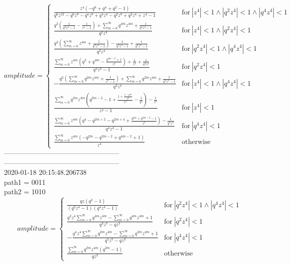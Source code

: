 $$amplitude = \begin{cases} \frac{z^{4} \left(- q^{6} + q^{4} + q^{2} - 1\right)}{q^{6} z^{12} - q^{6} z^{8} - q^{4} z^{8} + q^{4} z^{4} - q^{2} z^{8} + q^{2} z^{4} + z^{4} - 1} & \text{for}\: \left|{z^{4}}\right| < 1 \wedge \left|{q^{2} z^{4}}\right| < 1 \wedge \left|{q^{4} z^{4}}\right| < 1 \\\frac{q^{2} \left(\frac{1}{q^{2} z^{4} - 1} - \frac{1}{z^{4} - 1}\right) + \sum_{m=0}^{\infty} q^{4 m} z^{4 m} + \frac{1}{q^{2} z^{4} - 1}}{q^{2} z^{4}} & \text{for}\: \left|{z^{4}}\right| < 1 \wedge \left|{q^{2} z^{4}}\right| < 1 \\\frac{q^{2} \left(\sum_{m=0}^{\infty} z^{4 m} + \frac{1}{q^{2} z^{4} - 1}\right) - \frac{1}{q^{4} z^{4} - 1} + \frac{1}{q^{2} z^{4} - 1}}{q^{2} z^{4}} & \text{for}\: \left|{q^{2} z^{4}}\right| < 1 \wedge \left|{q^{4} z^{4}}\right| < 1 \\\frac{\sum_{m=0}^{\infty} z^{4 m} \left(q^{2} + q^{4 m} - \frac{q^{4 m - 2} + 1}{z^{4}}\right) + \frac{1}{z^{4}} + \frac{1}{q^{2} z^{4}}}{q^{2} z^{4} - 1} & \text{for}\: \left|{q^{2} z^{4}}\right| < 1 \\- \frac{q^{2} \left(\sum_{m=0}^{\infty} q^{2 m} z^{4 m} + \frac{1}{z^{4} - 1}\right) + \sum_{m=0}^{\infty} q^{2 m} z^{4 m} + \frac{1}{q^{4} z^{4} - 1}}{q^{2} z^{4}} & \text{for}\: \left|{z^{4}}\right| < 1 \wedge \left|{q^{4} z^{4}}\right| < 1 \\\frac{\sum_{m=0}^{\infty} q^{2 m} z^{4 m} \left(q^{2 m - 2} - 1 + \frac{1 + \frac{1 - q^{2 m}}{q^{2}}}{z^{4}} - \frac{1}{q^{2}}\right) - \frac{1}{z^{4}}}{z^{4} - 1} & \text{for}\: \left|{z^{4}}\right| < 1 \\\frac{\sum_{m=0}^{\infty} z^{4 m} \left(q^{4} - q^{2 m + 2} - q^{2 m + 4} + \frac{q^{2 m} + q^{2 m - 2} - 1}{z^{4}}\right) - \frac{1}{q^{2} z^{4}}}{q^{4} z^{4} - 1} & \text{for}\: \left|{q^{4} z^{4}}\right| < 1 \\\frac{\sum_{m=0}^{\infty} z^{4 m} \left(- q^{2 m} - q^{2 m - 2} + q^{4 m - 2} + 1\right)}{z^{4}} & \text{otherwise} \end{cases}$$
--------------------------------------------------\\
--------------------------------------------------\\
2020-01-18 20:15:48.206738\\
path1 = 0011\\
path2 = 1010\\
$$amplitude = \begin{cases} \frac{q z \left(q^{2} - 1\right)}{\left(q^{2} z^{4} - 1\right) \left(q^{4} z^{4} - 1\right)} & \text{for}\: \left|{q^{2} z^{4}}\right| < 1 \wedge \left|{q^{4} z^{4}}\right| < 1 \\\frac{q^{2} z^{4} \sum_{m=0}^{\infty} q^{4 m} z^{4 m} - \sum_{m=0}^{\infty} q^{4 m} z^{4 m} + 1}{q^{3} z^{7} - q z^{3}} & \text{for}\: \left|{q^{2} z^{4}}\right| < 1 \\- \frac{q^{4} z^{4} \sum_{m=0}^{\infty} q^{2 m} z^{4 m} - \sum_{m=0}^{\infty} q^{2 m} z^{4 m} + 1}{q^{5} z^{7} - q z^{3}} & \text{for}\: \left|{q^{4} z^{4}}\right| < 1 \\\frac{\sum_{m=0}^{\infty} q^{2 m} z^{4 m} \left(q^{2 m} - 1\right)}{q z^{3}} & \text{otherwise} \end{cases}$$
